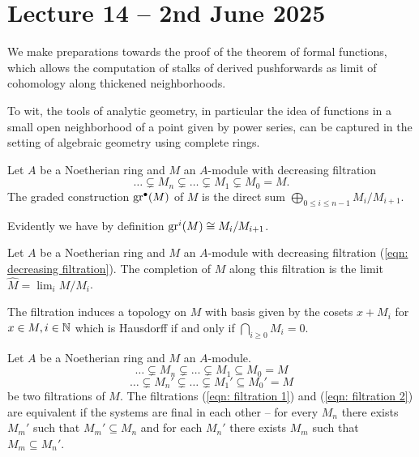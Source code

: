 \section{Lecture 14 -- 2nd June 2025}\label{sec: lecture 14}
We make preparations towards the proof of the theorem of formal functions, which allows the computation of stalks of derived pushforwards as limit of cohomology along thickened neighborhoods. 

To wit, the tools of analytic geometry, in particular the idea of functions in a small open neighborhood of a point given by power series, can be captured in the setting of algebraic geometry using complete rings. 
\begin{definition}\label{def: graded module}
    Let $A$ be a Noetherian ring and $M$ an $A$-module with decreasing filtration
    \begin{equation}\label{eqn: decreasing filtration}
        \dots\subsetneq M_{n}\subsetneq\dots\subsetneq M_{1}\subsetneq M_{0}=M.
    \end{equation}
    The graded construction $\mathrm{gr}^{\bullet}(M)$ of $M$ is the direct sum $\bigoplus_{0\leq i\leq n-1} M_{i}/M_{i+1}$.
\end{definition}
\begin{remark}\label{rmk: associated graded}
    Evidently we have by definition $\mathrm{gr}^{i}(M)\cong M_{i}/M_{i+1}$. 
\end{remark}
\begin{definition}\label{def: completion along filtration}
    Let $A$ be a Noetherian ring and $M$ an $A$-module with decreasing filtration (\ref{eqn: decreasing filtration}). The completion of $M$ along this filtration is the limit $\widehat{M}=\lim_{i}M/M_{i}$. 
\end{definition}
The filtration induces a topology on $M$ with basis given by the cosets $x+M_{i}$ for $x\in M,i\in\mathbb{N}$ which is Hausdorff if and only if $\bigcap_{i\geq0}M_{i}=0$. 
\begin{definition}\label{def: equivalent filtrations}
    Let $A$ be a Noetherian ring and $M$ an $A$-module. 
    \begin{equation}\label{eqn: filtration 1}
        \dots\subsetneq M_{n}\subsetneq \dots\subsetneq M_{1}\subseteq M_{0}=M
    \end{equation} 
    \begin{equation}\label{eqn: filtration 2}
        \dots\subsetneq M_{n}'\subsetneq \dots\subsetneq M_{1}'\subseteq M_{0}'=M
    \end{equation}
    be two filtrations of $M$. The filtrations (\ref{eqn: filtration 1}) and (\ref{eqn: filtration 2}) are equivalent if the systems are final in each other -- for every $M_{n}$ there exists $M_{m}'$ such that $M_{m}'\subseteq M_{n}$ and for each $M_{n}'$ there exists $M_{m}$ such that $M_{m}\subseteq M_{n}'$. 
\end{definition}
